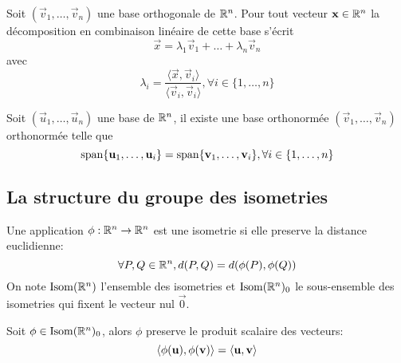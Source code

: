 \begin{proposition}
	Soit $(\vec{v}_1, \dots, \vec{v}_n)$ une base orthogonale de $\mathbb{R}^n$. Pour
	tout vecteur $\mathbf{x} \in \mathbb{R}^n$ la décomposition en combinaison linéaire de
	cette base s'écrit
	\begin{equation*}
		\vec{x} = \lambda_1 \vec{v}_1 + \dots + \lambda_n \vec{v}_n
	\end{equation*}
	avec
	\begin{equation*}
		\lambda_i = \frac{\langle \vec{x}, \vec{v}_i \rangle}{\langle \vec{v}_i, 
		\vec{v}_i \rangle}, \forall i \in \{1, \dots, n\}
	\end{equation*}
\end{proposition}

\begin{theorem}
	Soit $(\vec{u}_1, \dots, \vec{u}_n)$ une base de $\mathbb{R}^n$, il existe une base
	orthonormée $(\vec{v}_1, \dots, \vec{v}_n)$ orthonormée telle que
	\begin{equation*}
		\operatorname{span}\{ \mathbf{u}_1, \dots, \mathbf{u}_i \} = \operatorname{span}\{ \mathbf{v}_1,\dots,
		\mathbf{v}_i\}, \forall i \in \{1, \dots, n\}
	\end{equation*}
\end{theorem}

\subsection{La structure du groupe des isometries}

\begin{definition}
	Une application $\phi: \mathbb{R}^n \to \mathbb{R}^n$ est une isometrie si elle preserve la
	distance euclidienne:
	\begin{equation*}
		\forall P, Q \in \mathbb{R}^n, d(P, Q) = d(\phi(P), \phi(Q))
	\end{equation*}
	On note $\operatorname{Isom}(\mathbb{R}^n)$ l'ensemble des isometries et $\operatorname{Isom}(\mathbb{R}^n)_0$ le
	sous-ensemble des isometries qui fixent le vecteur nul $\vec{0}$.
\end{definition}

\begin{proposition}
	Soit $\phi \in \operatorname{Isom}(\mathbb{R}^n)_0$, alors $\phi$ preserve le produit scalaire des
	vecteurs:
	\begin{equation*}
		\langle \phi(\mathbf{u}), \phi(\mathbf{v}) \rangle = \langle \mathbf{u}, \mathbf{v} \rangle 
	\end{equation*}
\end{proposition}

